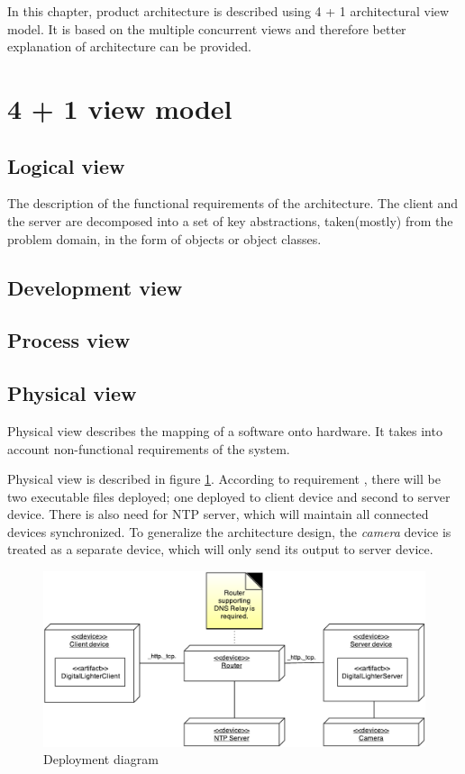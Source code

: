 In this chapter, product architecture is described using 4 + 1 architectural view model.
It is based on the multiple concurrent views and therefore better explanation of architecture can be provided.

\section{4 + 1 view model}
\subsection{Logical view}
The description of the functional requirements of the architecture. The client and the server are decomposed into a set of key abstractions, taken(mostly) from the problem domain, in the form of objects or object classes.

\subsection{Development view}
\subsection{Process view}
\subsection{Physical view}
Physical view \cite{Kruchten:1995:VMA:624610.625529} describes the mapping of a software onto hardware. 
It takes into account non-functional requirements of the system.

Physical view is described in figure \ref{fig:architecture_deployment_diagram}.
According to requirement , there will be two executable files deployed; one deployed to client device and second to server device.
There is also need for NTP server, which will maintain all connected devices synchronized.
To generalize the architecture design, the \emph{camera} device is treated as a separate device, which will only send its output to server device.
\begin{figure}[H]
	\centering
		\includegraphics[width=15cm]{softwareArchitecture/deployment-diagram.pdf}
	\caption{Deployment diagram}
	\label{fig:architecture_deployment_diagram}
\end{figure}
